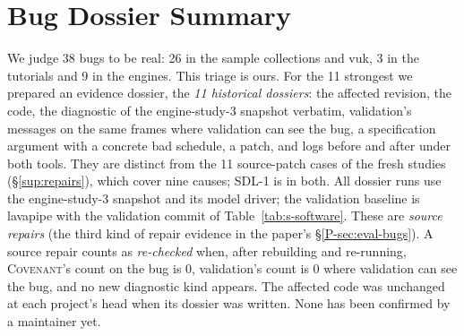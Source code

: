\documentclass[acmtog,anonymous,review]{acmart}
\newcommand{\sys}{\textsc{Covenant}\xspace}
\begin{document}
\section{Bug Dossier Summary}
\label{sup:dossiers}

We judge 38 bugs to be real: 26 in the sample collections and vuk, 3 in the tutorials and 9 in the engines. This triage
is ours. For the 11 strongest we prepared an evidence dossier, the \emph{11 historical dossiers}: the affected
revision, the code, the diagnostic of the engine-study-3 snapshot verbatim, validation's messages on the same frames
where validation can see the bug, a specification argument with a concrete bad schedule, a patch, and logs before and
after under both tools. They are distinct from the 11 source-patch cases of the fresh studies (\S\ref{sup:repairs}),
which cover nine causes; SDL-1 is in both. All dossier runs use the engine-study-3 snapshot and
its model driver; the validation baseline is lavapipe with the validation commit of Table~\ref{tab:s-software}. These are \emph{source repairs} (the third kind of repair evidence in the paper's \S\ref{P-sec:eval-bugs}). A source repair counts as \emph{re-checked} when,
after rebuilding and re-running, \sys's count on the bug is 0, validation's count is 0 where validation can see the bug,
and no new diagnostic kind appears. The affected code was unchanged at each project's head when its dossier was
written. None has been confirmed by a maintainer yet.
\end{document}
